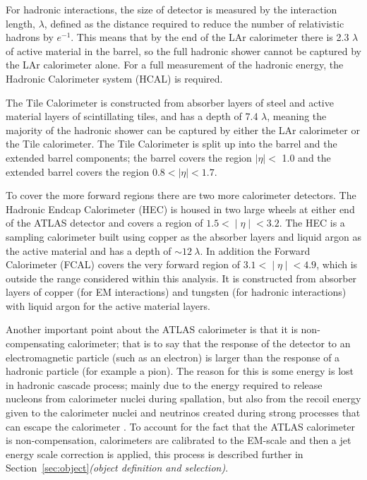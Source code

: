 For hadronic interactions, the size of detector is measured by the interaction length, $\lambda$,
defined as the distance required to reduce the number of relativistic hadrons by $e^{-1}$.
This means that by the end of the LAr calorimeter there is 2.3 $\lambda$ of active material in the barrel,
so the full hadronic shower cannot be captured by the LAr calorimeter alone.
For a full measurement of the hadronic energy, the Hadronic Calorimeter system (HCAL) is required. 

The Tile Calorimeter is constructed from absorber layers of steel and active material layers of scintillating tiles,
and has a depth of 7.4 $\lambda$, meaning the majority of the hadronic shower can be captured by either the LAr calorimeter or the Tile calorimeter.
The Tile Calorimeter is split up into the barrel and the extended barrel components;
the barrel covers the region $|\eta| <$ 1.0 and the extended barrel covers the region $0.8 < |\eta| < 1.7$. 

To cover the more forward regions there are two more calorimeter detectors.
The Hadronic Endcap Calorimeter (HEC) is housed in two large wheels at either end of the ATLAS detector
and covers a region of $1.5 < ∣\eta∣ < 3.2$.
The HEC is a sampling calorimeter built using copper as the absorber layers and liquid argon as the active material
and has a depth of $\sim 12~\lambda$.
In addition the Forward Calorimeter (FCAL) covers the very forward region of $3.1 < ∣\eta∣ < 4.9$,
which is outside the range considered within this analysis.
It is constructed from absorber layers of
copper (for EM interactions)
and tungsten (for hadronic interactions)
with liquid argon for the active material layers. 

Another important point about the ATLAS calorimeter is that it is non-compensating calorimeter;
that is to say that the response of the detector to an electromagnetic particle (such as an electron)
is larger than the response of a hadronic particle (for example a pion).
The reason for this is some energy is lost in hadronic cascade process;
mainly due to the energy required to release nucleons from calorimeter nuclei during spallation,
but also from the recoil energy given to the calorimeter nuclei
and neutrinos created during strong processes that can escape the calorimeter \cite{det-comp_calo, det-thesis_lene}.
To account for the fact that the ATLAS calorimeter is non-compensation,
calorimeters are calibrated to the EM-scale
and then a jet energy scale correction is applied,
this process is described further in Section~\ref{sec:object}\textit{(object definition and selection)}. 

